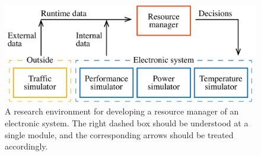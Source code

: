 \begin{figure}[b]
  \centering
  \includegraphics[width=1.0\columnwidth]{include/assets/figures/development.pdf}
  \caption{
    A research environment for developing a resource manager of an electronic
    system. The right dashed box should be understood at a single module, and
    the corresponding arrows should be treated accordingly.
  }
\end{figure}
